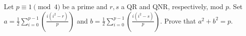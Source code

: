 Let $p\equiv1\pmod4$ be a prime and $r,s$ a QR and QNR, respectively, mod $p$. Set $a=\frac{1}{2}\displaystyle\sum_{i=0}^{p-1}\left(\frac{i\left(i^2-r\right)}{p}\right)$ and $b=\frac{1}{2}\displaystyle\sum_{i=0}^{p-1}\left(\frac{i\left(i^2-s\right)}{p}\right)$. Prove that $a^2+b^2=p$.